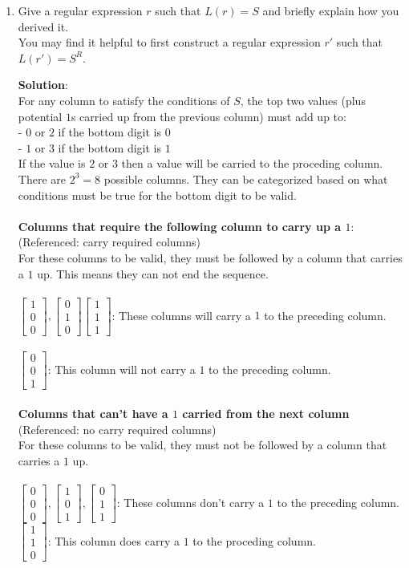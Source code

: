 \documentclass[11pt]{article}
\newcommand{\zzz}{\left [ \begin{array}{c}0\\0\\0 \end{array}\right ]}
\newcommand{\zzo}{\left [ \begin{array}{c}0\\0\\1 \end{array} \right ]}
\newcommand{\zoz}{\left [ \begin{array}{c}0\\1\\0 \end{array}\right ]}
\newcommand{\zoo}{\left [ \begin{array}{c}0\\1\\1 \end{array}\right ]}
\newcommand{\ooo}{\left [ \begin{array}{c}1\\1\\1 \end{array}\right ]}
\newcommand{\ozo}{\left [ \begin{array}{c}1\\0\\1 \end{array} \right ]}
\newcommand{\ozz}{\left [ \begin{array}{c}1\\0\\0 \end{array}\right ]}
\newcommand{\ooz}{\left [ \begin{array}{c}1\\1\\0 \end{array}\right ]}
\begin{document}
\begin{enumerate}
\item
\begin{question}
Give a regular expression $r$ such that $L(r) = S$ and briefly explain how you derived it.\\
You may find it helpful to first construct a regular expression $r'$ such that $L(r') = S^R$.
\end{question}

\begin{solution}
{\bf Solution}:\\
For any column to satisfy the conditions of $S$, the top two values (plus potential $1$s carried up from the previous column) must add up to:\\
- $0$ or $2$ if the bottom digit is $0$\\
- $1$ or $3$ if the bottom digit is $1$\\
If the value is $2$ or $3$ then a value will be carried to the proceding column.\\
There are $2^3 = 8$ possible columns. They can be categorized based on what conditions must be true for the bottom digit to be valid.\\\\
{\bf Columns that require the following column to carry up a $1$}:\\
(Referenced: carry required columns)\\
For these columns to be valid, they must be followed by a column that carries a $1$ up. This means they can not end the sequence.\\\\
$ \ozz, \zoz \ooo $: These columns will carry a $1$ to the preceding column.\\\\
$ \zzo $: This column will not carry a $1$ to the preceding column.\\\\
{\bf Columns that can't have a $1$ carried from the next column}\\
(Referenced: no carry required columns)\\
For these columns to be valid, they must not be followed by a column that carries a $1$ up.\\\\
$ \zzz, \ozo, \zoo$: These columns don't carry a $1$ to the preceding column.\\
$\ooz$: This column does carry a $1$ to the proceding column.\\\\

\end{solution}
\end{enumerate}
\end{document}
